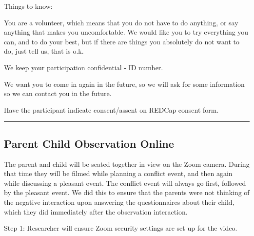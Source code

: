 \documentclass[]{book}
\begin{document}
Things to know:

You are a volunteer, which means that you do not have to do anything, or say anything that makes you uncomfortable. We would like you to try everything you can, and to do your best, but if there are things you absolutely do not want to do, just tell us, that is o.k.

We keep your participation confidential - ID number.

We want you to come in again in the future, so we will ask for some information so we can contact you in the future.

Have the participant indicate consent/assent on REDCap consent form.

\begin{center}\rule{0.5\linewidth}{0.5pt}\end{center}

\hypertarget{parent-child-observation-online}{%
\subsection{Parent Child Observation Online}\label{parent-child-observation-online}}

The parent and child will be seated together in view on the Zoom camera. During that time they will be filmed while planning a conflict event, and then again while discussing a pleasant event. The conflict event will always go first, followed by the pleasant event. We did this to ensure that the parents were not thinking of the negative interaction upon answering the questionnaires about their child, which they did immediately after the observation interaction.

Step 1:
Researcher will ensure Zoom security settings are set up for the video.
\end{document}
